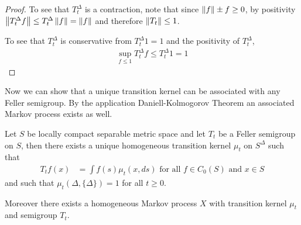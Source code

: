 \begin{proof}
To see that $T^\Delta_t$ is a contraction, note that since $\left \lVert f \right \rVert \pm f \geq 0$, by positivity $\left \lVert T^\Delta_t f \right \rVert \leq T^\Delta_t \left \lVert f \right \rVert = \left \lVert f \right \rVert$ and therefore $\left \lVert T_t \right \rVert \leq 1$.

To see that $T^\Delta_t$ is conservative from $T^\Delta_t 1 = 1$ and the positivity of $T^\Delta_t$,
\begin{align*}
\sup_{f \leq 1} T^\Delta_t f \leq T^\Delta_t 1 = 1
\end{align*}
\end{proof}

Now we can show that a unique transition kernel can be associated with
any Feller semigroup.  By the application Daniell-Kolmogorov Theorem an associated
Markov process exists as well.

\begin{prop}\label{FellerSemigroupToTransitionKernel}Let $S$ be locally compact separable metric space and let $T_t$ be a Feller semigroup on $S$, then there exists
a unique homogeneous transition kernel $\mu_t$ on $S^\Delta$ such that
\begin{align*}
T_t f(x) &= \int f(s) \mu_t(x, ds) \text{ for all $f \in C_0(S)$ and $x \in S$}
\end{align*}
and such that $\mu_t(\Delta, \lbrace \Delta \rbrace) =1$ for all $t \geq 0$.
\end{prop}
Moreover there exists a homogeneous Markov process $X$ with transition kernel $\mu_t$ and semigroup $T_t$.
